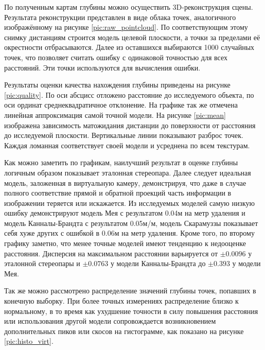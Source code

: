 
По полученным картам глубины можно осуществить 3D-реконструкция сцены. Результата реконструкции представлен  в виде облака точек, 
 аналогичного изображённому на рисунке \ref{pic:raw_pointcloud}. По соответствующим этому снимку дистанциям строится модель целевой плоскости, 
 а точки за пределами её окрестности отбрасываются. Далее из оставшихся выбираются 1000 случайных точек, что позволяет считать ошибку с 
 одинаковой точностью для всех расстояний.  %
Эти точки используются для вычисления ошибки. 


Результаты оценки качества нахождения глубины приведены на рисунке \ref{pic:quality}. По оси абсцисс отложено расстояние до исследуемого объекта,
по оси ординат среднеквадратичное отклонение. На графике так же отмечена линейная аппроксимация самой точной модели.
 На рисунке \ref{pic:mean} изображена зависимость матожидания дистанции до поверхности от расстояния
до исследуемой плоскости. Вертикальные линии показывают разброс точек.  Каждая ломанная соответствует своей модели и усреднена по всем текстурам.



Как можно заметить по графикам, наилучший результат в оценке глубины логичным образом показывает эталонная стереопара. Далее следует 
идеальная модель, заложенная в виртуальную камеру, демонстрируя, что даже в случае полного соответствие прямой и обратной проекций часть 
информации в изображении теряется или искажается. Из исследуемых моделей самую низкую ошибку демонстрируют модель Мея с результатом
0.04м на метр удаления и модель Канналы-Брандта с результатом 0.05м/м, модель Скарамуззы показывает себя хуже других с ошибкой в 0.06м на метр удаления.
 Кроме того, по второму графику заметно, что менее точные моделей имеют тенденцию к недооценке расстояния.  Дисперсия на максимальном 
 расстоянии варьируется от $\pm 0.0096$ у эталонной стереопары и $\pm 0.0763$ у модели Канналы-Брандта 
до $\pm 0.393$ у модели Мея. %

Так же можно рассмотрено распределение значений глубины точек, попавших в конечную выборку. При более точных измерениях
распределение близко к нормальному, в то время как ухудшение точности в силу повышения расстояния или использования другой модели
сопровождается возникновением дополнительных пиков или скосов на гистограмме, как показано на рисунке \ref{pic:histo_virt}. 




